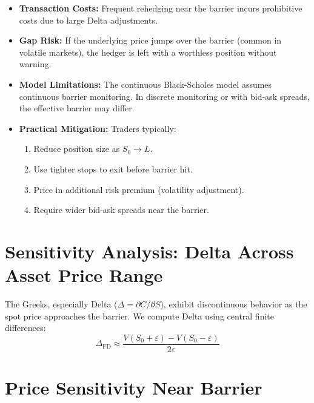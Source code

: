 \documentclass{report}
\begin{document}
\begin{itemize}
    \item \textbf{Transaction Costs:} Frequent rehedging near the barrier incurs prohibitive costs due to large Delta adjustments.
    
    \item \textbf{Gap Risk:} If the underlying price jumps over the barrier (common in volatile markets), the hedger is left with a worthless position without warning.
    
    \item \textbf{Model Limitations:} The continuous Black-Scholes model assumes continuous barrier monitoring. In discrete monitoring or with bid-ask spreads, the effective barrier may differ.
    
    \item \textbf{Practical Mitigation:} Traders typically:
    \begin{enumerate}
        \item Reduce position size as $S_0 \to L$.
        \item Use tighter stops to exit before barrier hit.
        \item Price in additional risk premium (volatility adjustment).
        \item Require wider bid-ask spreads near the barrier.
    \end{enumerate}
\end{itemize}

\section{Sensitivity Analysis: Delta Across Asset Price Range}

The Greeks, especially Delta ($\Delta = \partial C / \partial S$), exhibit discontinuous behavior as the spot price approaches the barrier. We compute Delta using central finite differences:
$$\Delta_{\text{FD}} \approx \frac{V(S_0 + \varepsilon) - V(S_0 - \varepsilon)}{2\varepsilon}$$

\section{Price Sensitivity Near Barrier}
\end{document}
